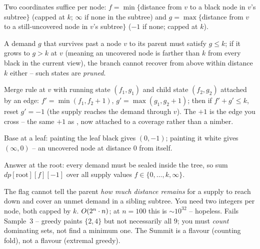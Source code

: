 \begin{observation}
Two coordinates suffice per node: $f = \min\{$distance from $v$ to a black node
in $v$'s subtree$\}$ (capped at $k$; $\infty$ if none in the subtree) and
$g = \max\{$distance from $v$ to a still-uncovered node in $v$'s subtree$\}$
($-1$ if none; capped at $k$).
\end{observation}
\begin{observation}
A demand $g$ that survives past a node $v$ to its parent must satisfy $g \le k$;
if it grows to $g > k$ at $v$ (meaning an uncovered node is farther than $k$ from
every black in the current view), the branch cannot recover from above within
distance $k$ either -- such states are \emph{pruned}.
\end{observation}
\begin{observation}
Merge rule at $v$ with running state $(f_1, g_1)$ and child state $(f_2, g_2)$
attached by an edge: $f' = \min(f_1, f_2 + 1)$, $g' = \max(g_1, g_2 + 1)$; then
if $f' + g' \le k$, reset $g' = -1$ (the supply reaches the demand through $v$).
The $+1$ is the edge you cross -- the same $+1$ as , now
attached to a coverage rather than a nimber.
\end{observation}
\begin{observation}
Base at a leaf: painting the leaf black gives $(0, -1)$; painting it white gives
$(\infty, 0)$ -- an uncovered node at distance $0$ from itself.
\end{observation}
\begin{observation}
Answer at the root: every demand must be sealed inside the tree, so sum
$\mathit{dp}[\text{root}][f][-1]$ over all supply values $f \in \{0, \dots, k, \infty\}$.
\end{observation}

\begin{thinkbox}
{The flag cannot tell the parent \emph{how much distance remains} for a supply
to reach down and cover an unmet demand in a sibling subtree. You need two
integers per node, both capped by $k$.}
{$O(2^n \cdot n)$; at $n = 100$ this is $\sim 10^{32}$ -- hopeless.}
{Fails Sample~3 -- greedy paints $\{2, 4\}$ but not necessarily all $9$; you
must \emph{count} dominating sets, not find a minimum one. The Summit is a
 flavour (counting fold), not a
 flavour (extremal greedy).}
\end{thinkbox}

